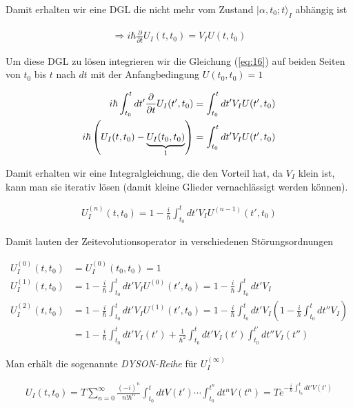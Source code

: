 Damit erhalten wir eine DGL die nicht mehr vom Zustand \(|\alpha,t_0;t\rangle_I\) abhängig ist

\begin{align}
  \label{eq:16}
  \Rightarrow \boxed{i\hbar  \frac{\partial}{\partial t}U_I(t,t_0) = V_IU(t,t_0)}
\end{align}

Um diese DGL zu lösen integrieren wir die Gleichung (\ref{eq:16}) auf beiden Seiten von \(t_0\) bis \(t\) nach \(dt\) mit der Anfangbedingung \(U(t_0,t_0)=1\)

\begin{align}
  \label{eq:17}
i\hbar  \int_{t_0}^{t}dt' \frac{\partial}{\partial t}U_I(t',t_0) &= \int_{t_0}^{t}dt' V_IU(t',t_0)\notag \\
i\hbar \left(  U_I(t,t_0) -\underbrace{U_I(t_0,t_0) }_{1} \right)  &= \int_{t_0}^{t}dt' V_IU(t',t_0)
\end{align}

Damit erhalten wir eine Integralgleichung, die den Vorteil hat, da \(V_I\) klein ist, kann man sie iterativ lösen (damit kleine Glieder vernachlässigt werden können).

\begin{align}
  \label{eq:18}
  U_I^{(n)}(t,t_0) = 1 - \frac{i}{\hbar} \int_{t_0}^{t}dt' V_IU^{(n-1)}(t',t_0)
\end{align}

Damit lauten der Zeitevolutionsoperator in verschiedenen Störungsordnungen

\begin{align}
  U_I^{(0)}(t,t_0) &= U_I^{(0)}(t_0,t_0) = 1  \label{eq:19.0} \\
 U_I^{(1)}(t,t_0) &=  1 - \frac{i}{\hbar} \int_{t_0}^{t}dt' V_IU^{(0)}(t',t_0) =  1 - \frac{i}{\hbar} \int_{t_0}^{t}dt' V_I  \label{eq:19.1}\\
 U_I^{(2)}(t,t_0) &=  1 - \frac{i}{\hbar} \int_{t_0}^{t}dt' V_IU^{(1)}(t',t_0) =  1 - \frac{i}{\hbar} \int_{t_0}^{t}dt' V_I\left(  1 - \frac{i}{\hbar} \int_{t_0}^{t}dt'' V_I \right) \\
&= 1 - \frac{i}{\hbar} \int_{t_0}^{t}dt' V_I(t')  +  \frac{1}{\hbar^2} \int_{t_0}^{t}dt' V_I(t') \int_{t_0}^{t'}dt'' V_I(t'')  \label{eq:19.2}
\end{align}

Man erhält die sogenannte \textit{DYSON-Reihe} für \(U_I^{(\infty)}\)

\begin{align}
  \label{eq:20}
 \boxed{ U_I(t,t_0) = T \sum_{n=0}^\infty \frac{(-i)^n}{n! \hbar^n}\int_{t_0}^tdtV(t')\cdots\int_{t_0}^{t^n}dt^n V(t^n) = Te^{-\frac{i}{\hbar} \int_{t_0}^t dt' V(t') } }
\end{align}

